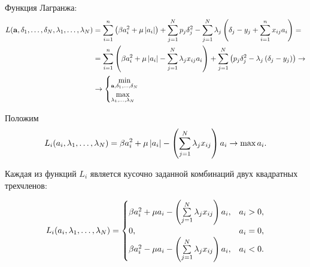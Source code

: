 Функция Лагранжа:
\begin{equation}
	\label{LagrWEN}
	\begin{split}
		L(\boldsymbol{\mathbf{a}},\delta_{1},\ldots,\delta_{N}, \lambda_{1},\ldots,\lambda_{N}) 
	&= \sum\limits_{i=1}^n\left(\beta a_i^2 + \mu \left|a_i\right|\right) + \sum\limits_{j=1}^N p_j\delta_j^2 - \sum_{j=1}^N\lambda_j\left(\delta_j - y_j + \sum\limits_{i=1}^nx_{ij}a_i\right) = \\
	&= \sum\limits_{i=1}^n\left(\beta a_i^2 + \mu \left|a_i\right| - \sum\limits_{j=1}^N\lambda_jx_{ij}a_i\right) + \sum\limits_{j=1}^N \left(p_j\delta_j^2  - \lambda_j\left(\delta_j - y_j\right)\right) \to \\
	&\to 
	\begin{cases}
		\mathop{\mbox{min}}\limits_{\boldsymbol{\mathbf{a}},\delta_{1},\ldots,\delta_{N}}\\
		\mathop{\mbox{max}}\limits_{\lambda_{1},\ldots,\lambda_{N}}\\
	\end{cases}
	\end{split}
\end{equation}

Положим 
\begin{equation}
	\label{partialLagr}
	L_i(a_i,\lambda_{1},\ldots,\lambda_{N}) = \beta a_i^2 + \mu \left|a_i\right| - \left(\sum\limits_{j=1}^N\lambda_jx_{ij}\right)a_i \to \mathop{\mbox{max}}\limits{a_i}.
\end{equation}

Каждая из функций $L_i$ является кусочно заданной комбинаций двух квадратных трехчленов:

\begin{equation}
	\label{partialLagrParted}
	L_i(a_i,\lambda_{1},\ldots,\lambda_{N}) =
\begin{cases}
	\beta a_i^2 + \mu a_i - \left(\sum\limits_{j=1}^N\lambda_jx_{ij}\right)a_i, &a_i > 0,\\
	0, &a_i = 0,\\
	\beta a_i^2 - \mu a_i - \left(\sum\limits_{j=1}^N\lambda_jx_{ij}\right)a_i, &a_i < 0.\\
\end{cases}
\end{equation}
